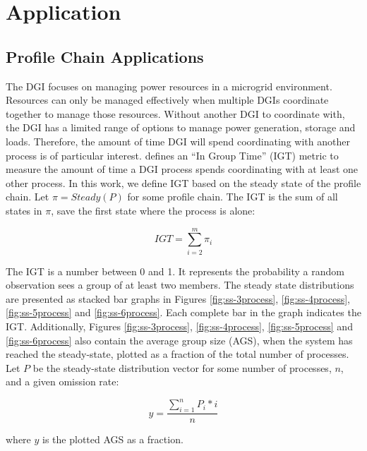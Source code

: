 
\chapter{Application}

\section{Profile Chain Applications}

The DGI focuses on managing power resources in a microgrid environment.
Resources can only be managed effectively when multiple DGIs coordinate together to manage those resources.
Without another DGI to coordinate with, the DGI has a limited range of options to manage power generation, storage and loads.
Therefore, the amount of time DGI will spend coordinating with another process is of particular interest.
\cite{CRITIS2012} defines an ``In Group Time'' (IGT) metric to measure the amount of time a DGI process spends coordinating with at least one other process.
In this work, we define IGT based on the steady state of the profile chain.
Let $\pi=Steady(P)$ for some profile chain.
The IGT is the sum of all states in $\pi$, save the first state where the process is alone:

\begin{equation} IGT = \sum_{i=2}^{m} \pi_i \end{equation}

The IGT is a number between 0 and 1.
It represents the probability a random observation sees a group of at least two members.
The steady state distributions are presented as stacked bar graphs in Figures \ref{fig:ss-3process}, \ref{fig:ss-4process}, \ref{fig:ss-5process} and \ref{fig:ss-6process}.
Each complete bar in the graph indicates the IGT.
Additionally, Figures \ref{fig:ss-3process}, \ref{fig:ss-4process}, \ref{fig:ss-5process} and \ref{fig:ss-6process} also contain the average group size (AGS), when the system has reached the steady-state, plotted as a fraction of the total number of processes.
Let $P$ be the steady-state distribution vector for some number of processes, $n$, and a given omission rate:

\begin{equation} y = \frac{\sum_{i=1}^{n} P_{i}*i}{n} \label{eq:ss-means} \end{equation}

where $y$ is the plotted AGS as a fraction.

